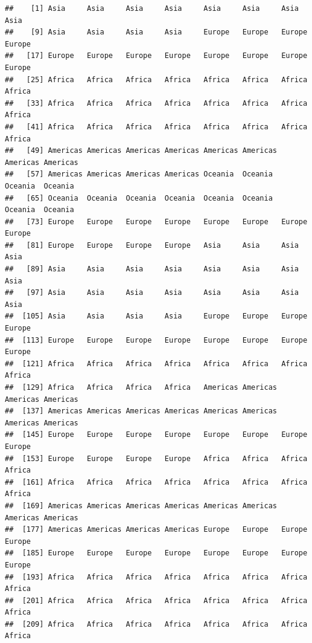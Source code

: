 \documentclass[
]{article}
\newenvironment{Shaded}{\begin{snugshade}}{\end{snugshade}}
\newcommand{\CommentTok}[1]{\textcolor[rgb]{0.56,0.35,0.01}{\textit{#1}}}
\newcommand{\NormalTok}[1]{#1}
\newcommand{\OperatorTok}[1]{\textcolor[rgb]{0.81,0.36,0.00}{\textbf{#1}}}
\begin{document}
\begin{Shaded}
\end{Shaded}

\begin{verbatim}
##    [1] Asia     Asia     Asia     Asia     Asia     Asia     Asia     Asia    
##    [9] Asia     Asia     Asia     Asia     Europe   Europe   Europe   Europe  
##   [17] Europe   Europe   Europe   Europe   Europe   Europe   Europe   Europe  
##   [25] Africa   Africa   Africa   Africa   Africa   Africa   Africa   Africa  
##   [33] Africa   Africa   Africa   Africa   Africa   Africa   Africa   Africa  
##   [41] Africa   Africa   Africa   Africa   Africa   Africa   Africa   Africa  
##   [49] Americas Americas Americas Americas Americas Americas Americas Americas
##   [57] Americas Americas Americas Americas Oceania  Oceania  Oceania  Oceania 
##   [65] Oceania  Oceania  Oceania  Oceania  Oceania  Oceania  Oceania  Oceania 
##   [73] Europe   Europe   Europe   Europe   Europe   Europe   Europe   Europe  
##   [81] Europe   Europe   Europe   Europe   Asia     Asia     Asia     Asia    
##   [89] Asia     Asia     Asia     Asia     Asia     Asia     Asia     Asia    
##   [97] Asia     Asia     Asia     Asia     Asia     Asia     Asia     Asia    
##  [105] Asia     Asia     Asia     Asia     Europe   Europe   Europe   Europe  
##  [113] Europe   Europe   Europe   Europe   Europe   Europe   Europe   Europe  
##  [121] Africa   Africa   Africa   Africa   Africa   Africa   Africa   Africa  
##  [129] Africa   Africa   Africa   Africa   Americas Americas Americas Americas
##  [137] Americas Americas Americas Americas Americas Americas Americas Americas
##  [145] Europe   Europe   Europe   Europe   Europe   Europe   Europe   Europe  
##  [153] Europe   Europe   Europe   Europe   Africa   Africa   Africa   Africa  
##  [161] Africa   Africa   Africa   Africa   Africa   Africa   Africa   Africa  
##  [169] Americas Americas Americas Americas Americas Americas Americas Americas
##  [177] Americas Americas Americas Americas Europe   Europe   Europe   Europe  
##  [185] Europe   Europe   Europe   Europe   Europe   Europe   Europe   Europe  
##  [193] Africa   Africa   Africa   Africa   Africa   Africa   Africa   Africa  
##  [201] Africa   Africa   Africa   Africa   Africa   Africa   Africa   Africa  
##  [209] Africa   Africa   Africa   Africa   Africa   Africa   Africa   Africa  

\end{verbatim}
\end{document}
